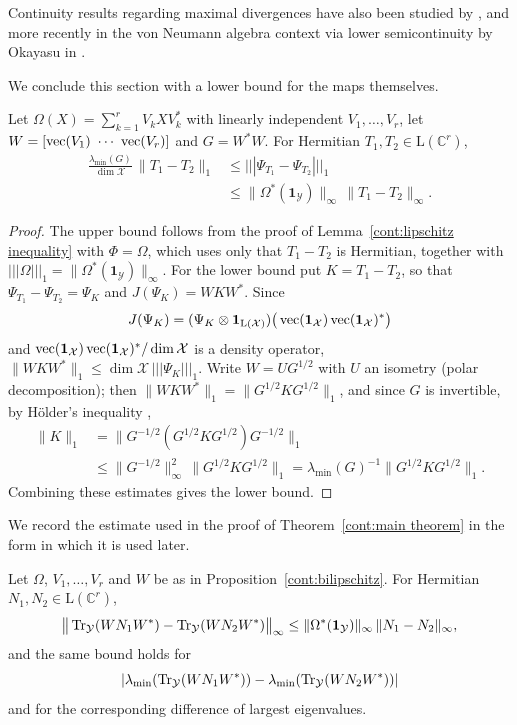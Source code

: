 Continuity results regarding maximal divergences have also been studied by \cite{MosonyiHiai2024}, and more recently in the von Neumann algebra context via lower semicontinuity by Okayasu in \cite{Okayasu2026maxf}. 

 We conclude this section with a lower bound for the maps themselves.
 \begin{proposition}\label{cont:bilipschitz}
Let $\Omega(X)=\sum_{k=1}^rV_kXV_k^*$ with linearly independent $V_1,\dots,V_r$, let
$W=[\vectorise(V_1)\ \cdots\ \vectorise(V_r)]$ and $G=W^*W$. For Hermitian $T_1,T_2\in\mathrm{L}(\mathbb{C}^r)$,
\begin{align*}
\frac{\lambda_{\min}(G)}{\dim\mathcal{X}}\,\|T_1-T_2\|_1&\leq|||\Psi_{T_1}-\Psi_{T_2}|||_1\\
&\leq\|\Omega^*(\mathbf{1}_{\mathcal{Y}})\|_\infty\,\|T_1-T_2\|_\infty .
\end{align*}
\end{proposition}
\begin{proof}
The upper bound follows from the proof of Lemma~\ref{cont:lipschitz inequality} with $\Phi=\Omega$, which uses only that $T_1-T_2$ is Hermitian, together with $|||\Omega|||_1=\|\Omega^*(\mathbf{1}_{\mathcal{Y}})\|_\infty$. For the lower bound put $K=T_1-T_2$, so that
$\Psi_{T_1}-\Psi_{T_2}=\Psi_K$ and $J(\Psi_K)=WKW^*$. Since
\[
J(\Psi_K)=(\Psi_K\otimes\mathbf{1}_{\mathrm{L}(\mathcal{X})})\big(\operatorname{vec}(\mathbf{1}_{\mathcal{X}})\operatorname{vec}(\mathbf{1}_{\mathcal{X}})^*\big)
\]
and $\operatorname{vec}(\mathbf{1}_{\mathcal{X}})\operatorname{vec}(\mathbf{1}_{\mathcal{X}})^*/\dim\mathcal{X}$ is a density operator,
$\|WKW^*\|_1\leq\dim\mathcal{X}\,|||\Psi_K|||_1$. Write $W=UG^{1/2}$ with $U$ an isometry (polar decomposition); then
$\|WKW^*\|_1=\|G^{1/2}KG^{1/2}\|_1$, and since $G$ is invertible,
by H\"older's inequality \cite[Chapter~IV]{bhatia1997matrix},
\begin{align*}
\|K\|_1&=\|G^{-1/2}(G^{1/2}KG^{1/2})G^{-1/2}\|_1\\
&\leq\|G^{-1/2}\|_\infty^2\,\|G^{1/2}KG^{1/2}\|_1=\lambda_{\min}(G)^{-1}\|G^{1/2}KG^{1/2}\|_1.
\end{align*} Combining these estimates gives the lower bound.
\end{proof}

We record the estimate used in the proof of Theorem~\ref{cont:main theorem} in the form in which it is used later.

\begin{lemma}\label{cont:lem:partial trace}
Let $\Omega$, $V_1,\dots,V_r$ and $W$ be as in Proposition~\ref{cont:bilipschitz}. For Hermitian $N_1,N_2\in\mathrm{L}(\mathbb{C}^r)$,
\[
\big\|\operatorname{Tr}_{\mathcal{Y}}(WN_1W^*)-\operatorname{Tr}_{\mathcal{Y}}(WN_2W^*)\big\|_\infty\leq\|\Omega^*(\mathbf{1}_{\mathcal{Y}})\|_\infty\,\|N_1-N_2\|_\infty ,
\]
and the same bound holds for
\[
|\lambda_{\min}(\operatorname{Tr}_{\mathcal{Y}}(WN_1W^*))-\lambda_{\min}(\operatorname{Tr}_{\mathcal{Y}}(WN_2W^*))|
\]
and for the corresponding difference of largest eigenvalues.
\end{lemma}

